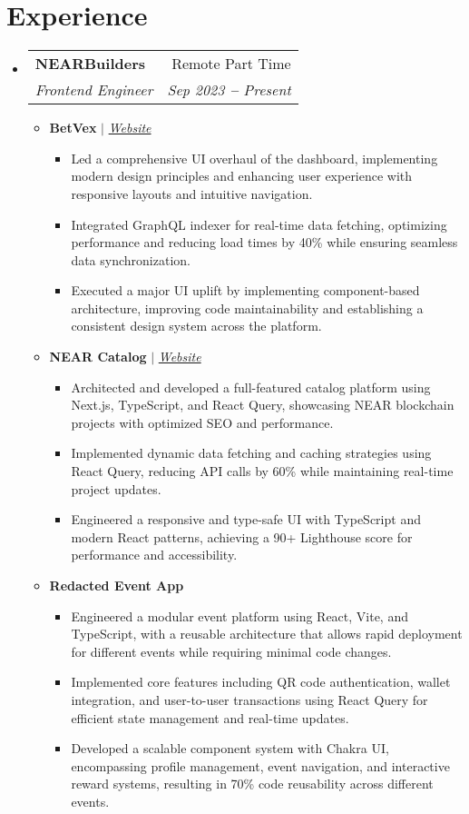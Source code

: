 \documentclass[a4paper,11pt]{article}
\makeatletter
\newcommand{\resumeItem}[1]{
  \item\small{
    {#1 \vspace{-2pt}}
  }
}
\newcommand{\resumeSubheading}[4]{
  \vspace{-2pt}\item
    \begin{tabular*}{0.97\textwidth}[t]{l@{\extracolsep{\fill}}r}
      \textbf{#1} & #2 \\
      \textit{\small#3} & \textit{\small #4} \\
    \end{tabular*}\vspace{-7pt}
}
\newcommand{\resumeSubHeadingListStart}{\begin{itemize}[leftmargin=0.15in, label={}]}
\newcommand{\resumeSubHeadingListEnd}{\end{itemize}}
\newcommand{\resumeItemListStart}{\begin{itemize}}
\newcommand{\resumeItemListEnd}{\end{itemize}\vspace{-5pt}}
\makeatother
\begin{document}

\section{Experience}
\vspace{3pt}
\resumeSubHeadingListStart

\resumeSubheading
{NEARBuilders}{Remote Part Time}
{Frontend Engineer}{Sep 2023 \textbf{--} Present}
\resumeItemListStart
\resumeItem{\textbf{BetVex} $|$ \emph{\href{https://betvex.xyz}{\color{blue}Website}}
  \resumeItemListStart
  \resumeItem{
    Led a comprehensive UI overhaul of the dashboard, implementing modern design principles and enhancing user experience with responsive layouts and intuitive navigation.}
  \resumeItem{
    Integrated GraphQL indexer for real-time data fetching, optimizing performance and reducing load times by 40\% while ensuring seamless data synchronization.}
  \resumeItem{
    Executed a major UI uplift by implementing component-based architecture, improving code maintainability and establishing a consistent design system across the platform.}
  \resumeItemListEnd
}
\resumeItem{
  \vspace{9pt}
  \textbf{NEAR Catalog} $|$ \emph{\href{https://nearcatalog.xyz}{\color{blue}Website}}
  \resumeItemListStart
  \resumeItem{
    Architected and developed a full-featured catalog platform using Next.js, TypeScript, and React Query, showcasing NEAR blockchain projects with optimized SEO and performance.}
  \resumeItem{
    Implemented dynamic data fetching and caching strategies using React Query, reducing API calls by 60\% while maintaining real-time project updates.}
  \resumeItem{
    Engineered a responsive and type-safe UI with TypeScript and modern React patterns, achieving a 90+ Lighthouse score for performance and accessibility.}
  \resumeItemListEnd
}
\resumeItem{
  \vspace{9pt}
  \textbf{Redacted Event App}
  \resumeItemListStart
  \resumeItem{
    Engineered a modular event platform using React, Vite, and TypeScript, with a reusable architecture that allows rapid deployment for different events while requiring minimal code changes.}
  \resumeItem{
    Implemented core features including QR code authentication, wallet integration, and user-to-user transactions using React Query for efficient state management and real-time updates.}
  \resumeItem{
    Developed a scalable component system with Chakra UI, encompassing profile management, event navigation, and interactive reward systems, resulting in 70\% code reusability across different events.}
  \resumeItemListEnd
}
\resumeItemListEnd
\resumeSubHeadingListEnd
\end{document}

